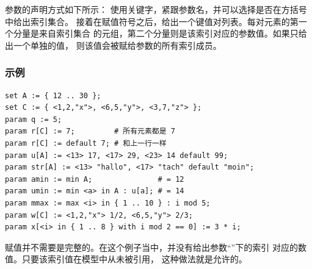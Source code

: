 参数的声明方式如下所示：
使用关键字，紧跟参数名，并可以选择是否在方括号中给出索引集合。
接着在赋值符号之后，给出一个键值对列表。每对元素的第一个分量是来自索引集合
的元组，第二个分量则是该索引对应的参数值。如果只给出一个单独的值，
则该值会被赋给参数的所有索引成员。

\subsubsection{示例}
{\small
\begin{verbatim}
set A := { 12 .. 30 };
set C := { <1,2,"x">, <6,5,"y">, <3,7,"z"> };
param q := 5;
param r[C] := 7;         # 所有元素都是 7
param r[C] := default 7; # 和上一行一样
param u[A] := <13> 17, <17> 29, <23> 14 default 99;
param str[A] := <13> "hallo", <17> "tach" default "moin";
param amin := min A;               # = 12
param umin := min <a> in A : u[a]; # = 14
param mmax := max <i> in { 1 .. 10 } : i mod 5;
param w[C] := <1,2,"x"> 1/2, <6,5,"y"> 2/3;
param x[<i> in { 1 .. 8 } with i mod 2 == 0] := 3 * i;
\end{verbatim}
}
\noindent
赋值并不需要是完整的。在这个例子当中，并没有给出参数“”下的索引
对应的数值。只要该索引值在模型中从未被引用，
这种做法就是允许的。

